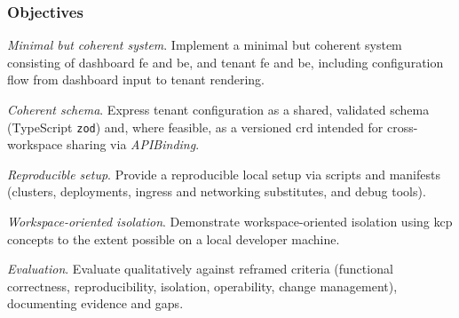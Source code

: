 \documentclass[11pt, a4paper, oneside, listof=totoc]{scrartcl}
\begin{document}
            \subsubsection{Objectives}\label{subsubsec:objectives}
                \begin{enumerate}[label={[\arabic*]:},
                        ref=Challenge~\arabic*,
                        leftmargin=*,
                        itemsep=0.6\baselineskip]

                        \item\label{chal:objectiveMinimal}
                            \textit{Minimal but coherent system}.
                            Implement a minimal but coherent system consisting of dashboard \gls{fe} and
                            \gls{be}, and tenant \gls{fe} and \gls{be}, including configuration flow
                            from dashboard input to tenant rendering.

                        \item\label{chal:objectiveSchema}
                            \textit{Coherent schema}.
                            Express tenant configuration as a shared, validated schema
                            (TypeScript \texttt{zod}) and, where feasible, as a versioned \gls{crd}
                            intended for cross-workspace sharing via \emph{APIBinding}.

                        \item\label{chal:objectiveReproducible}
                            \textit{Reproducible setup}.
                            Provide a reproducible local setup via scripts and manifests
                            (clusters, deployments, ingress and networking substitutes, and debug
                            tools).

                        \item\label{chal:objectiveIsolation}
                            \textit{Workspace-oriented isolation}.
                            Demonstrate workspace-oriented isolation using \gls{kcp} concepts to the
                            extent possible on a local developer machine.

                        \item\label{chal:objectiveEval}
                            \textit{Evaluation}.
                            Evaluate qualitatively against reframed criteria (functional correctness,
                            reproducibility, isolation, operability, change management), documenting
                            evidence and gaps.
                \end{enumerate}
\end{document}
